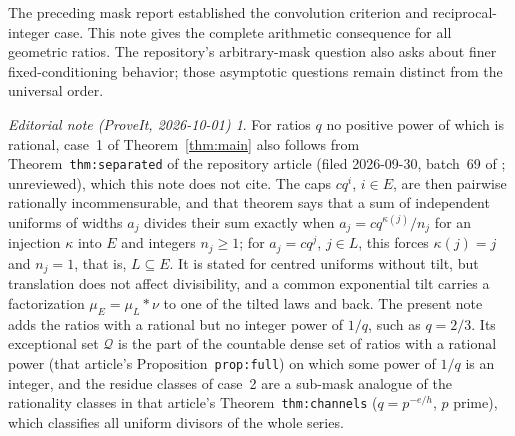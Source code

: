 \documentclass[11pt,a4paper]{article}
\theoremstyle{remark}\newtheorem*{ednote}{Editorial note (ProveIt, 2026-10-01)}
\begin{document}
The preceding mask report \cite{Masks} established the convolution criterion and reciprocal-integer case. This note gives the complete arithmetic consequence for all geometric ratios. The repository's arbitrary-mask question \cite{Repository} also asks about finer fixed-conditioning behavior; those asymptotic questions remain distinct from the universal order.
\begin{ednote}
For ratios $q$ no positive power of which is rational, case~1 of
Theorem~\ref{thm:main} also follows from Theorem~\texttt{thm:separated} of the
repository article
(filed 2026-09-30, batch~69 of ; unreviewed), which this
note does not cite. The caps $cq^i$, $i\in E$, are then pairwise rationally
incommensurable, and that theorem says that a sum of independent uniforms of
widths $a_j$ divides their sum exactly when $a_j=cq^{\kappa(j)}/n_j$ for an
injection $\kappa$ into $E$ and integers $n_j\ge1$; for $a_j=cq^j$, $j\in L$,
this forces $\kappa(j)=j$ and $n_j=1$, that is, $L\subseteq E$. It is stated
for centred uniforms without tilt, but translation does not affect
divisibility, and a common exponential tilt carries a factorization
$\mu_E=\mu_L*\nu$ to one of the tilted laws and back. The present note adds
the ratios with a rational but no integer power of $1/q$, such as $q=2/3$. Its
exceptional set $\mathcal Q$ is the part of the countable dense set of ratios
with a rational power (that article's Proposition~\texttt{prop:full}) on which
some power of $1/q$ is an integer, and the residue classes of case~2 are a
sub-mask analogue of the rationality classes in that article's
Theorem~\texttt{thm:channels} ($q=p^{-e/h}$, $p$ prime), which classifies all
uniform divisors of the whole series.
\end{ednote}
\end{document}
